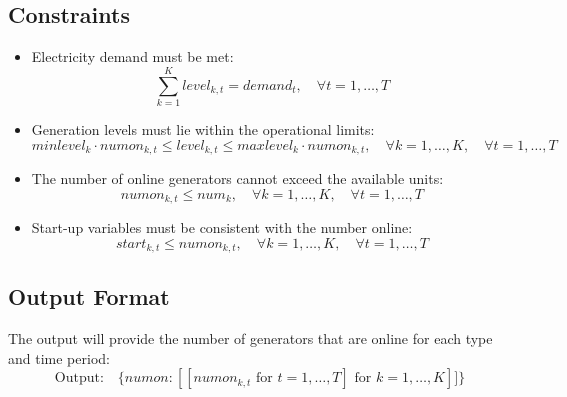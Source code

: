 \documentclass{article}
\begin{document}
\subsection*{Constraints}
\begin{itemize}
    \item Electricity demand must be met:
    \[
    \sum_{k=1}^{K} level_{k,t} = demand_t, \quad \forall t = 1, \ldots, T
    \]

    \item Generation levels must lie within the operational limits:
    \[
    minlevel_k \cdot numon_{k,t} \leq level_{k,t} \leq maxlevel_k \cdot numon_{k,t}, \quad \forall k = 1, \ldots, K, \quad \forall t = 1, \ldots, T
    \]

    \item The number of online generators cannot exceed the available units:
    \[
    numon_{k,t} \leq num_k, \quad \forall k = 1, \ldots, K, \quad \forall t = 1, \ldots, T
    \]

    \item Start-up variables must be consistent with the number online:
    \[
    start_{k,t} \leq numon_{k,t}, \quad \forall k = 1, \ldots, K, \quad \forall t = 1, \ldots, T
    \]

\end{itemize}

\subsection*{Output Format}
The output will provide the number of generators that are online for each type and time period:
\[
\text{Output:} \quad \{ numon: [[numon_{k,t} \text{ for } t=1,\ldots,T] \text{ for } k=1,\ldots,K] ] \}
\]
\end{document}
